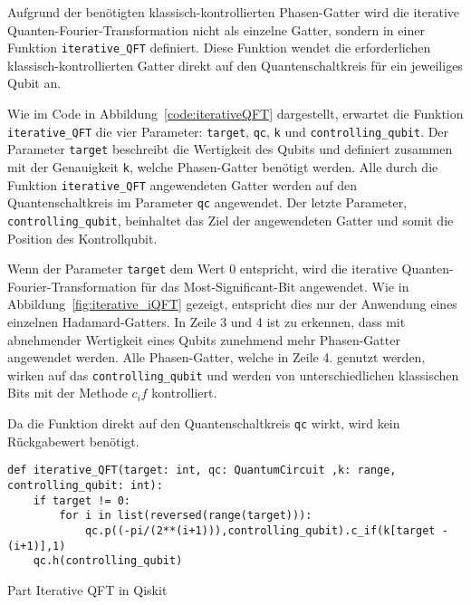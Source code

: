 \bigskip

Aufgrund der benötigten klassisch-kontrollierten Phasen-Gatter wird die iterative Quanten-Fourier-Transformation nicht als einzelne Gatter, 
sondern in einer Funktion \texttt{iterative_QFT} definiert.
Diese Funktion wendet die erforderlichen klassisch-kontrollierten Gatter direkt auf den Quantenschaltkreis für ein jeweiliges Qubit an.

Wie im Code in Abbildung~\ref{code:iterativeQFT} dargestellt, 
erwartet die Funktion \texttt{iterative_QFT} die vier Parameter: \texttt{target}, \texttt{qc}, \texttt{k} und \texttt{controlling_qubit}.
Der Parameter \texttt{target} beschreibt die Wertigkeit des Qubits und 
definiert zusammen mit der Genauigkeit \texttt{k}, 
welche Phasen-Gatter benötigt werden.
Alle durch die Funktion \texttt{iterative_QFT} angewendeten Gatter 
werden auf den Quantenschaltkreis im Parameter \texttt{qc} angewendet.
Der letzte Parameter, \texttt{controlling_qubit}, beinhaltet das Ziel der angewendeten Gatter und 
somit die Position des Kontrollqubit.

Wenn der Parameter \texttt{target} dem Wert 0 entspricht, 
wird die iterative Quanten-Fourier-Transformation für das Most-Significant-Bit angewendet.
Wie in Abbildung~\ref{fig:iterative_iQFT} gezeigt, entspricht dies nur der Anwendung eines einzelnen Hadamard-Gatters.
In Zeile 3 und 4 ist zu erkennen, 
dass mit abnehmender Wertigkeit eines Qubits zunehmend mehr Phasen-Gatter angewendet werden.
Alle Phasen-Gatter, welche in Zeile 4. genutzt werden, 
wirken auf das \texttt{controlling_qubit} und 
werden von unterschiedlichen klassischen Bits mit der Methode \(c_if\) kontrolliert.

Da die Funktion direkt auf den Quantenschaltkreis \texttt{qc} wirkt, 
wird kein Rückgabewert benötigt.
\begin{listing}[H]
\begin{verbatim}    
def iterative_QFT(target: int, qc: QuantumCircuit ,k: range, controlling_qubit: int):
    if target != 0:
        for i in list(reversed(range(target))):
            qc.p((-pi/(2**(i+1))),controlling_qubit).c_if(k[target - (i+1)],1)
    qc.h(controlling_qubit)
  \end{verbatim}
  \caption{Part Iterative QFT in Qiskit}
  \label{code:iterativeQFT}
\end{listing}

